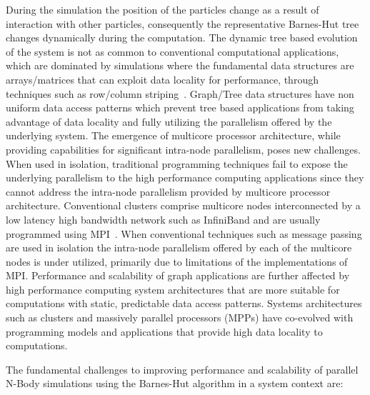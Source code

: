 \documentclass[floatfix]{revtex4}
\begin{document}
During the simulation the position of the particles change as a result
of interaction with other particles, consequently the representative Barnes-Hut tree 
changes dynamically during the computation. The dynamic tree based evolution of the 
system is not as common to conventional computational applications, which are
dominated by simulations where the 
fundamental data structures are arrays/matrices that can exploit data locality for performance, 
through techniques such as row/column striping~\cite{striping}.
Graph/Tree data structures have non uniform data access patterns
which prevent tree based applications from taking advantage of data locality and 
fully utilizing the parallelism offered by the underlying system. 
The emergence of multicore processor architecture, while providing capabilities
for significant intra-node parallelism, poses new challenges.
When used in isolation, traditional programming techniques 
fail to expose the underlying parallelism to the high performance 
computing applications since they cannot address the intra-node parallelism 
provided by multicore processor architecture. Conventional clusters comprise
multicore nodes interconnected by a low latency high bandwidth network such as 
InfiniBand and are usually
programmed using MPI~\cite{MPISpec}. When conventional techniques such as message passing 
are used in isolation the intra-node parallelism offered by each of the multicore nodes 
is under utilized, primarily due to limitations of the implementations of MPI. Performance 
and scalability of graph applications are further affected by high performance computing 
system architectures that are more suitable for computations with static, predictable data access 
patterns. Systems architectures such as clusters and massively parallel processors (MPPs) have co-evolved
with programming models and applications that provide high data locality to computations.

The fundamental challenges to improving performance and scalability of parallel N-Body 
simulations using the Barnes-Hut algorithm in a system context are:
\end{document}
